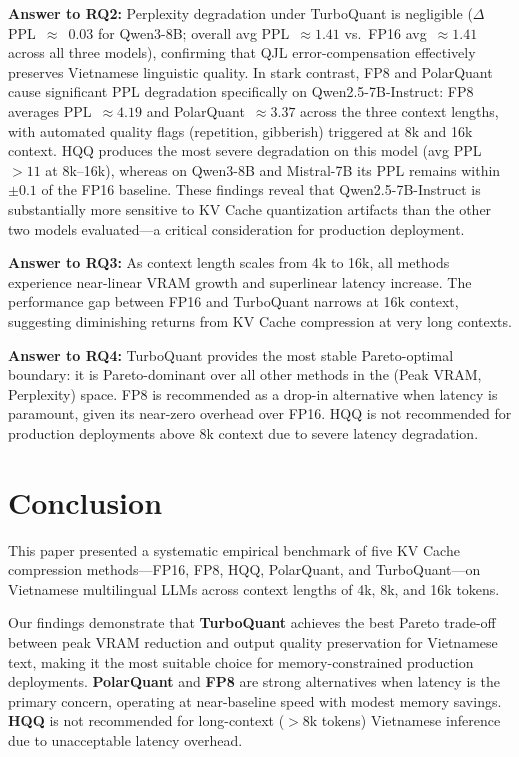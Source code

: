 \documentclass[10pt,twocolumn]{article}
\begin{document}
\noindent\textbf{Answer to RQ2:}
Perplexity degradation under TurboQuant is negligible
($\Delta$PPL~$\approx$~0.03 for Qwen3-8B; overall avg PPL~$\approx1.41$
vs.~FP16 avg~$\approx1.41$ across all three models), confirming that
QJL error-compensation effectively preserves Vietnamese linguistic quality.
In stark contrast, FP8 and PolarQuant cause significant PPL degradation
specifically on Qwen2.5-7B-Instruct: FP8 averages PPL~$\approx4.19$ and
PolarQuant~$\approx3.37$ across the three context lengths, with automated
quality flags (repetition, gibberish) triggered at 8k and 16k context.
HQQ produces the most severe degradation on this model
(avg PPL~$>11$ at 8k--16k), whereas on Qwen3-8B and Mistral-7B its PPL
remains within~$\pm0.1$ of the FP16 baseline.
These findings reveal that Qwen2.5-7B-Instruct is substantially more
sensitive to KV Cache quantization artifacts than the other two models
evaluated---a critical consideration for production deployment.

\noindent\textbf{Answer to RQ3:}
As context length scales from 4k to 16k, all methods experience
near-linear VRAM growth and superlinear latency increase.
The performance gap between FP16 and TurboQuant narrows at 16k context,
suggesting diminishing returns from KV Cache compression at very long contexts.

\noindent\textbf{Answer to RQ4:}
TurboQuant provides the most stable Pareto-optimal boundary:
it is Pareto-dominant over all other methods in the
(Peak VRAM, Perplexity) space.
FP8 is recommended as a drop-in alternative when latency is paramount,
given its near-zero overhead over FP16.
HQQ is not recommended for production deployments above 8k context
due to severe latency degradation.


\section{Conclusion}
\label{sec:conclusion}

This paper presented a systematic empirical benchmark of five KV
Cache compression methods---FP16, FP8, HQQ, PolarQuant, and TurboQuant---on
Vietnamese multilingual LLMs across context lengths of 4k, 8k, and 16k tokens.

Our findings demonstrate that \textbf{TurboQuant} achieves the best
Pareto trade-off between peak VRAM reduction and output quality preservation
for Vietnamese text, making it the most suitable choice for
memory-constrained production deployments.
\textbf{PolarQuant} and \textbf{FP8} are strong alternatives when
latency is the primary concern, operating at near-baseline speed
with modest memory savings.
\textbf{HQQ} is not recommended for long-context ($>$8k tokens)
Vietnamese inference due to unacceptable latency overhead.
\end{document}
